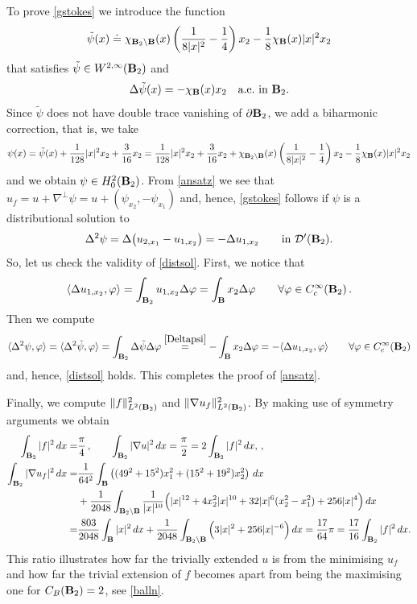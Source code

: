 \documentclass[11pt]{article}
\theoremstyle{plain}
\theoremstyle{definition}
\numberwithin{equation}{section}
\newcommand{\B}{{\bf B}}
\begin{document}
\begin{appendix}
$$$$
To prove \eqref{gstokes} we introduce the function
$$
\tilde\psi (x)\doteq \chi_{\B_2\setminus \B} (x)\left(\frac{1}{8|x|^2}-\frac14\right) x_2 -\frac18 \chi_{\B} (x) |x|^2 x_2
$$
that satisfies $\tilde\psi\in W^{2,\infty}(\B_2)$ and
\begin{equation}\label{Deltapsi}
	\Delta \tilde\psi (x)= -\chi_{\B} (x) x_2\quad\mbox{a.e.\ in }\B_2.
\end{equation}
Since $\tilde\psi$ does not have double trace vanishing of $\partial\B_2$,
we add a biharmonic correction, that is, we take
$$
\psi(x)=\tilde\psi (x)+\frac{1}{128}|x|^2 x_2 +\frac{3}{16}x_2=
\frac{1}{128}|x|^2x_2+\frac{3}{16}x_2+\chi_{\B_2\setminus \B}(x)\left(\frac{1}{8|x|^2}-\frac14\right)x_2-\frac18 \chi_{\B}(x)|x|^2 x_2
$$
and we obtain $\psi\in H^2_0(\B_2)$. From \eqref{ansatz} we see that $u_f=u+\nabla^\perp\psi=u+(\psi_{x_2},-\psi_{x_1})$  and, hence, \eqref{gstokes} follows if $\psi$ is
a distributional   solution to
\begin{equation}\label{distsol}
	\Delta^2 \psi =\Delta \big(u_{2,x_1}-u_{1,x_2}\big)=-\Delta u_{1,x_2}\qquad\mbox{in }\mathcal{D}'(\B_2).
\end{equation}
So, let us check the validity of \eqref{distsol}. First, we notice that
$$
\langle\Delta u_{1,x_2},\varphi\rangle =\int_{\B_2}u_{1,x_2}\Delta\varphi=\int_{\B}x_2\Delta\varphi\qquad\forall\varphi\in C^\infty_c(\B_2)\, .
$$
Then we compute
$$
\langle \Delta^2\psi,\varphi\rangle =\langle\Delta^2\tilde\psi,\varphi\rangle=
\int_{\B_2}\Delta\tilde\psi\Delta\varphi\stackrel{\eqref{Deltapsi}}{=}-\int_\B x_2\Delta\varphi=-\langle\Delta u_{1,x_2},\varphi\rangle\qquad\forall\varphi\in C^\infty_c(\B_2)
$$
and, hence, \eqref{distsol} holds. This completes the proof of \eqref{ansatz}.

Finally, we  compute $\|f\|^2_{L^2(\B_2)}$ and $\| \nabla u_f \|_{L^2(\B_2)}^2$. By making use of symmetry arguments we obtain
\begin{align*}
	\int_{\B_2} |f|^2\, dx=&\frac{\pi}{4}\, ,\qquad\int_{\B_2} |\nabla u|^2\, dx=\frac{\pi}{2}=2\int_{\B_2} |f|^2\, dx,\, ,\\
	\int_{\B_2} |\nabla u_f|^2\, dx =&\frac{1}{64^2}\int_\B \left( (49^2+15^2)x_1^2 +(15^2+19^2)x_2^2\right)\, dx\\
	&+ \frac{1}{2048}\int_{\B_2\setminus \B} \frac{1}{|x|^{10}} \Big(|x|^{12}+4x_2^2|x|^{10}+32|x|^6(x_2^2-x_1^2)+256|x|^4\Big)\, dx\\
	=&\frac{803}{2048}\int_\B |x|^2\, dx+ \frac{1}{2048}\int_{\B_2\setminus \B}  \Big(3|x|^{2}+256|x|^{-6}\Big)\, dx=
\frac{17}{64}\pi=\frac{17}{16}\int_{\B_2} |f|^2\, dx.
\end{align*}
This ratio illustrates how far the trivially extended $u$ is from the minimising $u_f$ and how far the trivial extension of $f$ becomes apart from being the maximising one for $C_B(\B_2)=2$, see \eqref{balln}.
	
\end{appendix}
\end{document}
